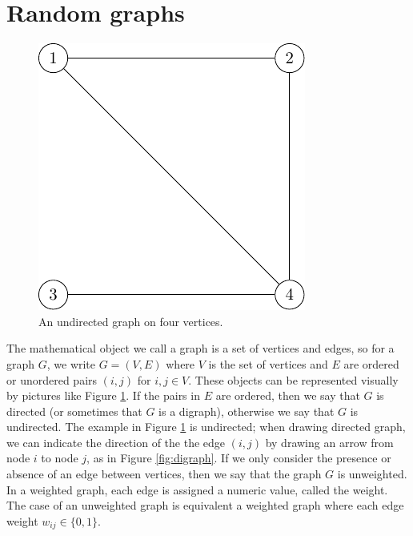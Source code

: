 \documentclass[12pt,twoside]{reedthesis}
\theoremstyle{definition}
\theoremstyle{definition}
\theoremstyle{remark}
\begin{document}
\section{Random graphs}\label{random-graphs}
\begin{figure}

{\centering \includegraphics{figure/small_net} 

}

\caption{An undirected graph on four vertices.}\label{fig:graph}
\end{figure}
The mathematical object we call a graph is a set of vertices and edges,
so for a graph \(G\), we write \(G = (V, E)\) where \(V\) is the set of
vertices and \(E\) are ordered or unordered pairs \((i, j)\) for
\(i, j \in V\). These objects can be represented visually by pictures
like Figure \ref{fig:graph}. If the pairs in \(E\) are ordered, then we
say that \(G\) is directed (or sometimes that \(G\) is a digraph),
otherwise we say that \(G\) is undirected. The example in Figure
\ref{fig:graph} is undirected; when drawing directed graph, we can
indicate the direction of the the edge \((i, j)\) by drawing an arrow
from node \(i\) to node \(j\), as in Figure \ref{fig:digraph}. If we
only consider the presence or absence of an edge between vertices, then
we say that the graph \(G\) is unweighted. In a weighted graph, each
edge is assigned a numeric value, called the weight. The case of an
unweighted graph is equivalent a weighted graph where each edge weight
\(w_{ij} \in \{0,1\} \).
\end{document}
